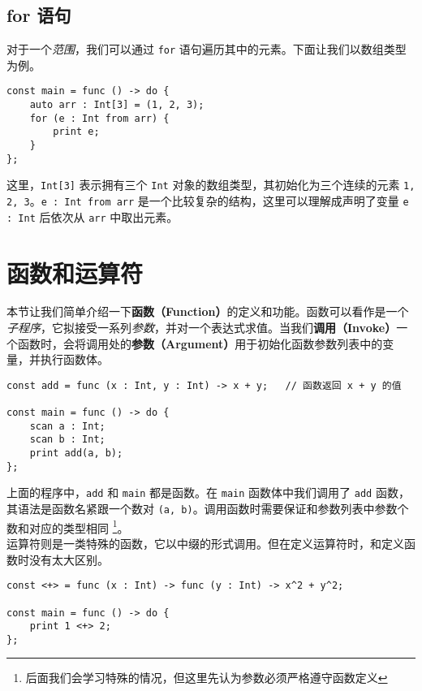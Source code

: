 \subsection{for 语句}

对于一个\emph{范围}，我们可以通过 \lstinline!for! 语句遍历其中的元素。下面让我们以数组类型为例。

\begin{lstlisting}
const main = func () -> do {
    auto arr : Int[3] = (1, 2, 3);
    for (e : Int from arr) {
        print e;
    }
};
\end{lstlisting}

这里，\lstinline!Int[3]! 表示拥有三个 \lstinline!Int! 对象的数组类型，其初始化为三个连续的元素 \lstinline!1, 2, 3!。\lstinline!e : Int from arr! 是一个比较复杂的结构，这里可以理解成声明了变量 \lstinline!e : Int! 后依次从 \lstinline!arr! 中取出元素。


\section{函数和运算符}

本节让我们简单介绍一下\textbf{函数（Function）}的定义和功能。函数可以看作是一个\emph{子程序}，它拟接受一系列\emph{参数}，并对一个表达式求值。当我们\textbf{调用（Invoke）}一个函数时，会将调用处的\textbf{参数（Argument）}用于初始化函数参数列表中的变量，并执行函数体。

\begin{lstlisting}
const add = func (x : Int, y : Int) -> x + y;	// 函数返回 x + y 的值

const main = func () -> do {
    scan a : Int;
    scan b : Int;
    print add(a, b);
};
\end{lstlisting}

上面的程序中，\lstinline!add! 和 \lstinline!main! 都是函数。在 \lstinline!main! 函数体中我们调用了 \lstinline!add! 函数，其语法是函数名紧跟一个数对 \lstinline!(a, b)!。调用函数时需要保证和参数列表中参数个数和对应的类型相同 \footnote{后面我们会学习特殊的情况，但这里先认为参数必须严格遵守函数定义}。 \\

运算符则是一类特殊的函数，它以中缀的形式调用。但在定义运算符时，和定义函数时没有太大区别。

\begin{lstlisting}
const <+> = func (x : Int) -> func (y : Int) -> x^2 + y^2;

const main = func () -> do {
    print 1 <+> 2;
};
\end{lstlisting}

